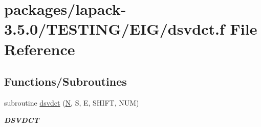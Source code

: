 \hypertarget{dsvdct_8f}{}\section{packages/lapack-\/3.5.0/\+T\+E\+S\+T\+I\+N\+G/\+E\+I\+G/dsvdct.f File Reference}
\label{dsvdct_8f}
\subsection*{Functions/\+Subroutines}
\begin{DoxyCompactItemize}
\item 
subroutine \hyperlink{group__double__eig_gacfc6bc302348dc1e4790a98d3bcefb67}{dsvdct} (\hyperlink{polmisc_8c_a0240ac851181b84ac374872dc5434ee4}{N}, S, E, S\+H\+I\+F\+T, N\+U\+M)
\begin{DoxyCompactList}\small\item\em {\bfseries D\+S\+V\+D\+C\+T} \end{DoxyCompactList}\end{DoxyCompactItemize}

